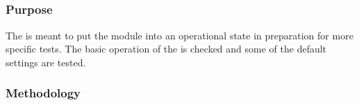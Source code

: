 \subsection{\pretest}
\label{ss:pretest}

\subsubsection{Purpose}

The \pretest is meant to put the module into an operational state in preparation for more specific tests.
The basic operation of the \roc is checked and some of the default \dac settings are tested.

\subsubsection{Methodology}

